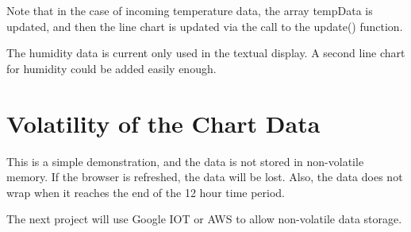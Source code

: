 \documentclass[letterpaper,]{book}
\begin{document}
Note that in the case of incoming temperature data, the array tempData
is updated, and then the line chart is updated via the call to the
update() function.

The humidity data is current only used in the textual display. A second
line chart for humidity could be added easily enough.

\section{Volatility of the Chart
Data}\label{volatility-of-the-chart-data}

This is a simple demonstration, and the data is not stored in
non-volatile memory. If the browser is refreshed, the data will be lost.
Also, the data does not wrap when it reaches the end of the 12 hour time
period.

The next project will use Google IOT or AWS to allow non-volatile data
storage.
\end{document}
